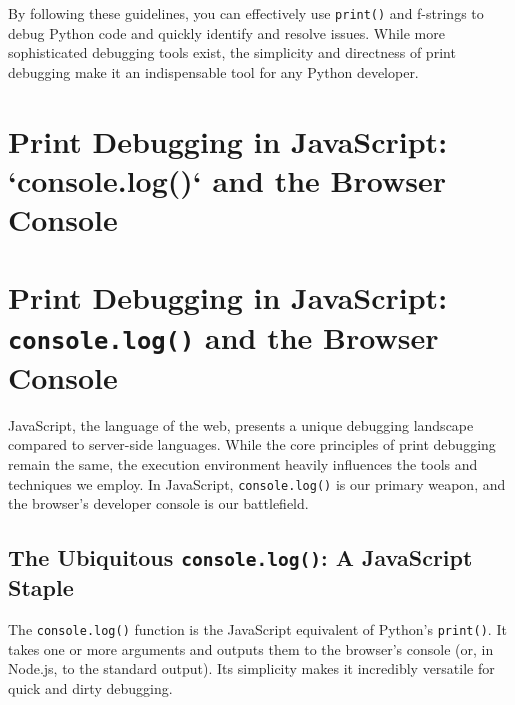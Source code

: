 \documentclass{article}
\begin{document}
{{{{By following these guidelines, you can effectively use \texttt{print()} and f-strings to debug Python code and quickly identify and resolve issues. While more sophisticated debugging tools exist, the simplicity and directness of print debugging make it an indispensable tool for any Python developer.

\newpage

\section*{Print Debugging in JavaScript: `console.log()` and the Browser Console} %
\label{chapter-9-2-Print_Debugging_in_JavaScript___console}

\section*{Print Debugging in JavaScript: \texttt{console.log()} and the Browser Console}

JavaScript, the language of the web, presents a unique debugging landscape compared to server-side languages. While the core principles of print debugging remain the same, the execution environment heavily influences the tools and techniques we employ. In JavaScript, \texttt{console.log()} is our primary weapon, and the browser's developer console is our battlefield.

\subsection*{The Ubiquitous \texttt{console.log()}: A JavaScript Staple}

The \texttt{console.log()} function is the JavaScript equivalent of Python's \texttt{print()}. It takes one or more arguments and outputs them to the browser's console (or, in Node.js, to the standard output). Its simplicity makes it incredibly versatile for quick and dirty debugging.

}}}}
\end{document}
